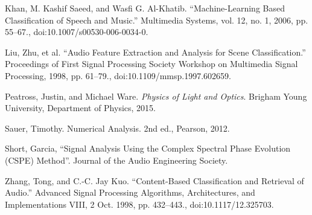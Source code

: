 \documentclass[12pt,letterpaper]{article}
\begin{document}
\begin{thebibliography}{9}


Khan, M. Kashif Saeed, and Wasfi G. Al-Khatib. “Machine-Learning Based Classification of Speech and Music.” Multimedia Systems, vol. 12, no. 1, 2006, pp. 55–67., doi:10.1007/s00530-006-0034-0.

Liu, Zhu, et al. “Audio Feature Extraction and Analysis for Scene Classification.” Proceedings of First Signal Processing Society Workshop on Multimedia Signal Processing, 1998, pp. 61–79., doi:10.1109/mmsp.1997.602659.

Peatross, Justin, and Michael Ware. \textit{Physics of Light and Optics}. Brigham Young University, Department of Physics, 2015.

Sauer, Timothy. Numerical Analysis. 2nd ed., Pearson, 2012.

Short, Garcia, “Signal Analysis Using the Complex Spectral Phase Evolution (CSPE) Method”. Journal of the Audio Engineering Society.

Zhang, Tong, and C.-C. Jay Kuo. “Content-Based Classification and Retrieval of Audio.” Advanced Signal Processing Algorithms, Architectures, and Implementations VIII, 2 Oct. 1998, pp. 432–443., doi:10.1117/12.325703.


\end{thebibliography}

\end{document}
